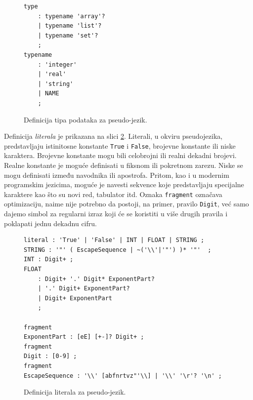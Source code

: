 \begin{figure}[h!]
\begin{lstlisting}[language={}]
type 
    : typename 'array'?
    | typename 'list'?
    | typename 'set'?
    ;
typename 
    : 'integer' 
    | 'real' 
    | 'string' 
    | NAME 
    ;
\end{lstlisting}
\caption{Definicija tipa podataka za pseudo-jezik.}
\label{fig:PseudoDef5}
\end{figure}

Definicija \emph{literala} je prikazana na slici \ref{fig:PseudoDef7}. Literali, u okviru pseudojezika, predstavljaju istinitosne konstante \texttt{True} i \texttt{False}, brojevne konstante ili niske karaktera. Brojevne konstante mogu bili celobrojni ili realni dekadni brojevi. Realne konstante je moguće definisati u fiksnom ili pokretnom zarezu. Niske se mogu definisati između navodnika ili apostrofa. Pritom, kao i u modernim programskim jezicima, moguće je navesti sekvence koje predstavljaju specijalne karaktere kao što su novi red, tabulator itd. Oznaka \texttt{fragment} označava optimizaciju, naime nije potrebno da postoji, na primer, pravilo \texttt{Digit}, već samo dajemo simbol za regularni izraz koji će se koristiti u više drugih pravila i poklapati jednu dekadnu cifru.

\begin{figure}[h!]
\begin{lstlisting}[language={}]
literal : 'True' | 'False' | INT | FLOAT | STRING ;
STRING : '"' ( EscapeSequence | ~('\\'|'"') )* '"'  ;
INT : Digit+ ;
FLOAT
    : Digit+ '.' Digit* ExponentPart?
    | '.' Digit+ ExponentPart?
    | Digit+ ExponentPart
    ;

fragment
ExponentPart : [eE] [+-]? Digit+ ;
fragment
Digit : [0-9] ;
fragment
EscapeSequence : '\\' [abfnrtvz"'\\] | '\\' '\r'? '\n' ;
\end{lstlisting}
\caption{Definicija literala za pseudo-jezik.}
\label{fig:PseudoDef7}
\end{figure}

